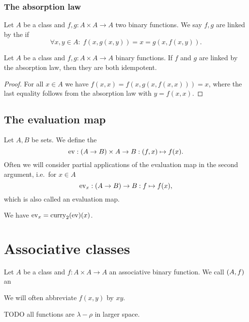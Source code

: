 \subsubsection{The absorption law}
\begin{definition}
Let $A$ be a class and $f,g: A\times A \to A$ two binary functions.
We say $f, g$ are linked by the  if
\[ \forall x,y\in A:\; f(x,g(x,y)) = x = g(x,f(x,y)). \]
\end{definition}

\begin{lemma} \label{absorptionIdempotency}
Let $A$ be a class and $f,g: A\times A\to A$ binary functions. If $f$ and $g$ are linked by the absorption law, then they are both idempotent.
\end{lemma}
\begin{proof}
For all $x\in A$ we have $f(x,x) = f(x,g(x,f(x,x))) = x$, where the last equality follows from the absorption law with $y = f(x,x)$.
\end{proof}

\subsection{The evaluation map}
\begin{definition}
Let $A,B$ be sets. We define the 
\[ \operatorname{ev}: (A\to B)\times A \to B: (f,x) \mapsto f(x). \]
Often we will consider partial applications of the evaluation map in the second argument, i.e.\ for $x\in A$
\[ \operatorname{ev}_x: (A\to B) \to B: f\mapsto f(x), \]
which is also called an evaluation map.
\end{definition}
We have $\operatorname{ev}_x = \operatorname{curry}_2(\operatorname{ev})(x)$.

\section{Associative classes}
\begin{definition}
Let $A$ be a class and $f: A\times A \to A$ an associative binary function. We call $\left( A,f \right)$ an 

We will often abbreviate $f(x,y)$ by $xy$.
\end{definition}
TODO all functions are $\lambda - \rho$ in larger space.

